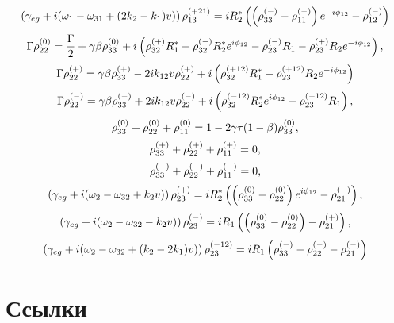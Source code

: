 \begin{equation}
    \left(\gamma_{eg}+i(\omega_{1}-\omega_{31}+(2k_2-k_1)v)\right)\rho^{(+21)}_{13}=iR_2^*\left(\left(\rho^{(-)}_{33}-\rho^{(-)}_{11}\right)e^{-i\phi_{12}}-\rho^{(-)}_{12}\right)
\end{equation}
\begin{equation}
    \Gamma \rho^{(0)}_{22}=\frac{\Gamma}{2}+\gamma\beta\rho^{(0)}_{33}+i\left(\rho^{(+)}_{32}R_1^*+\rho^{(-)}_{32}R_2^*e^{i\phi_{12}}-\rho^{(-)}_{23}R_1 -\rho^{(+)}_{23}R_2e^{ - i\phi_{12}} \right),
\end{equation}
\begin{equation}
    \Gamma\rho^{(+)}_{22} = \gamma\beta\rho^{(+)}_{33} - 2ik_{12}v\rho^{(+)}_{22} + i\left( \rho^{(+12)}_{32}R_1^* - \rho^{(+12)}_{23}R_2e^{-i\phi_{12}} \right)
\end{equation}
\begin{equation}
    \Gamma\rho^{(-)}_{22} = \gamma\beta\rho^{(-)}_{33} + 2ik_{12}v\rho^{(-)}_{22} + i\left( \rho^{(-12)}_{32}R_2^*e^{i\phi_{12}} - \rho^{(-12)}_{23}R_1 \right),
\end{equation}
\begin{equation}
    \rho^{(0)}_{33}+\rho^{(0)}_{22}+\rho^{(0)}_{11}=1-2\gamma\tau(1-\beta)\rho^{(0)}_{33},
\end{equation}
\begin{equation}
    \rho^{(+)}_{33}+\rho^{(+)}_{22}+\rho^{(+)}_{11}=0,
\end{equation}
\begin{equation}
    \rho^{(-)}_{33}+\rho^{(-)}_{22}+\rho^{(-)}_{11}=0,
\end{equation}
\begin{equation}
    \left(\gamma_{eg}+i(\omega_2-\omega_{32}+k_2v)\right)\rho^{(+)}_{23}=iR_2^*\left(\left(\rho^{(0)}_{33}-\rho^{(0)}_{22}\right)e^{i\phi_{12}}-\rho^{(-)}_{21}\right),
\end{equation}
\begin{equation}
    \left(\gamma_{eg}+i(\omega_2-\omega_{32}-k_2v)\right)\rho^{(-)}_{23}=iR_1\left(\left(\rho^{(0)}_{33}-\rho^{(0)}_{22}\right)-\rho^{(+)}_{21}\right),
\end{equation}
\begin{equation}
    \left(\gamma_{eg}+i(\omega_2-\omega_{32}+(k_2-2k_1)v)\right)\rho^{(-12)}_{23} = iR_1\left(\rho^{(-)}_{33}-\rho^{(-)}_{22}-\rho^{(-)}_{21}\right)
\end{equation}
\section{Ссылки}\label{sec:ch1/sec2}

\FloatBarrier
